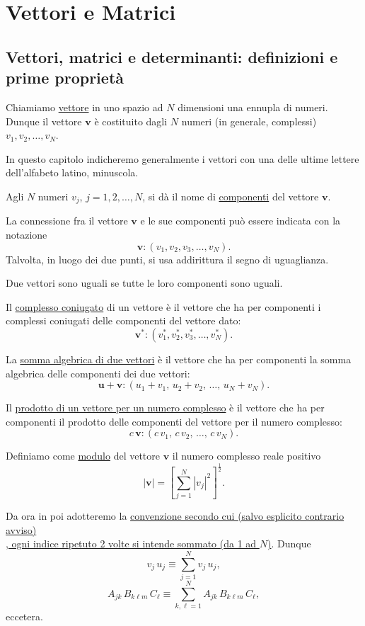 \documentclass[11pt, a4paper]{book}
\numberwithin{equation}{section}
\begin{document}
\chapter{Vettori e Matrici}

\section{Vettori, matrici e determinanti: definizioni e prime proprietà}

Chiamiamo \underline{vettore} in uno spazio ad $N$ dimensioni una ennupla di numeri. Dunque il vettore $\mathbf{v}$ è costituito dagli $N$ numeri (in generale, complessi) $v_1, v_2, \ldots, v_N$.

In questo capitolo indicheremo generalmente i vettori con una delle ultime lettere dell'alfabeto latino, minuscola.

Agli $N$ numeri $v_j$, $j = 1, 2, \ldots, N$, si dà il nome di \underline{componenti} del vettore $\mathbf{v}$.

La connessione fra il vettore $\mathbf{v}$ e le sue componenti può essere indicata con la notazione
\[
    \mathbf{v} : \left( v_1, v_2, v_3, \ldots, v_N \right).
\]
Talvolta, in luogo dei due punti, si usa addirittura il segno di uguaglianza.

Due vettori sono uguali se tutte le loro componenti sono uguali.

Il \underline{complesso coniugato} di un vettore è il vettore che ha per componenti i complessi coniugati delle componenti del vettore dato:
\[
    \mathbf{v}^* : \left( v_1^*, v_2^*, v_3^*, \ldots, v_N^* \right).
\]

La \underline{somma algebrica di due vettori} è il vettore che ha per componenti la somma algebrica delle componenti dei due vettori:
\[
    \mathbf{u} + \mathbf{v} : \left( u_1 + v_1,\, u_2 + v_2,\, \ldots,\, u_N + v_N \right).
\]

Il \underline{prodotto di un vettore per un numero complesso} è il vettore che ha per componenti il prodotto delle componenti del vettore per il numero complesso:
\[
    c\,\mathbf{v} : \left( c\,v_1,\, c\,v_2,\, \ldots,\, c\,v_N \right).
\]

Definiamo come \underline{modulo} del vettore $\mathbf{v}$ il numero complesso reale positivo
\begin{equation}
    |\mathbf{v}| = \left[ \sum_{j=1}^{N} |v_j|^2 \right]^{\frac{1}{2}}.
    \tag{1a}
\end{equation}

Da ora in poi adotteremo la \underline{convenzione secondo cui (salvo esplicito contrario avviso)} \\ \underline{, ogni indice ripetuto 2 volte si intende sommato (da 1 ad $N$)}. Dunque
\[
    v_j\, u_j \equiv \sum_{j=1}^{N} v_j\, u_j,
\]
\[
    A_{jk}\, B_{k\ell m}\, C_\ell \equiv \sum_{k,\ell=1}^{N} A_{jk}\, B_{k\ell m}\, C_\ell,
\]
eccetera.
\end{document}
